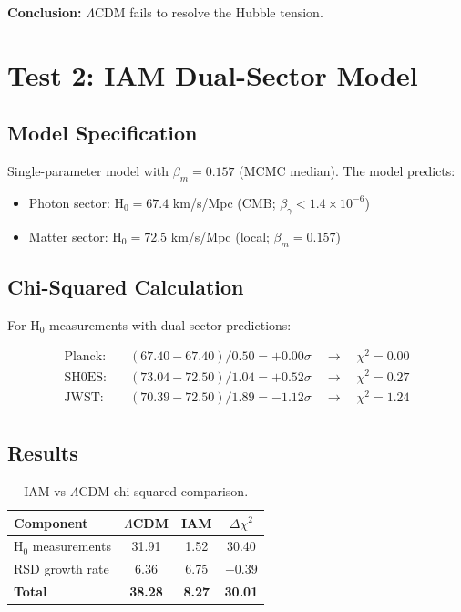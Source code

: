 \documentclass[11pt,letterpaper]{article}
\begin{document}
\noindent\textbf{Conclusion:} $\Lambda$CDM fails to resolve the Hubble tension.

\section{Test 2: IAM Dual-Sector Model}

\subsection{Model Specification}

Single-parameter model with $\beta_m = 0.157$ (MCMC median). The model predicts:

\begin{itemize}
\item Photon sector: H$_0 = 67.4$ km/s/Mpc (CMB; $\beta_\gamma < 1.4 \times 10^{-6}$)
\item Matter sector: H$_0 = 72.5$ km/s/Mpc (local; $\beta_m = 0.157$)
\end{itemize}

\subsection{Chi-Squared Calculation}

For H$_0$ measurements with dual-sector predictions:

\begin{align*}
\text{Planck:} \quad & (67.40 - 67.40)/0.50 = +0.00\sigma \quad \rightarrow \quad \chi^2 = 0.00 \\
\text{SH0ES:} \quad & (73.04 - 72.50)/1.04 = +0.52\sigma \quad \rightarrow \quad \chi^2 = 0.27 \\
\text{JWST:} \quad & (70.39 - 72.50)/1.89 = -1.12\sigma \quad \rightarrow \quad \chi^2 = 1.24 \\
\end{align*}

\subsection{Results}

\begin{table}[h]
\centering
\begin{tabular}{lccc}
\toprule
Component & $\Lambda$CDM & IAM & $\Delta\chi^2$ \\
\midrule
H$_0$ measurements & 31.91 & 1.52 & 30.40 \\
RSD growth rate & 6.36 & 6.75 & $-0.39$ \\
\midrule
\textbf{Total} & \textbf{38.28} & \textbf{8.27} & \textbf{30.01} \\
\bottomrule
\end{tabular}
\caption{IAM vs $\Lambda$CDM chi-squared comparison.}
\end{table}
\end{document}
